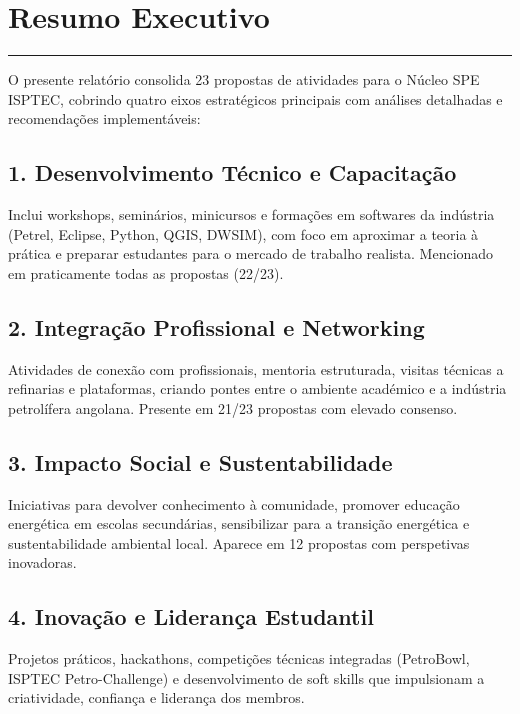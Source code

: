 \documentclass[12pt,a4paper]{article}
\begin{document}
\clearpage
\tableofcontents

\clearpage

\section*{Resumo Executivo}
\textcolor{spe-secondary}{\rule{\linewidth}{0.5pt}}

O presente relatório consolida 23 propostas de atividades para o Núcleo SPE ISPTEC, cobrindo quatro eixos estratégicos principais com análises detalhadas e recomendações implementáveis:

\subsection*{\textcolor{spe-blue}{1. Desenvolvimento Técnico e Capacitação}}
Inclui workshops, seminários, minicursos e formações em softwares da indústria (Petrel, Eclipse, Python, QGIS, DWSIM), com foco em aproximar a teoria à prática e preparar estudantes para o mercado de trabalho realista. Mencionado em praticamente todas as propostas (22/23).

\subsection*{\textcolor{spe-secondary}{2. Integração Profissional e Networking}}
Atividades de conexão com profissionais, mentoria estruturada, visitas técnicas a refinarias e plataformas, criando pontes entre o ambiente académico e a indústria petrolífera angolana. Presente em 21/23 propostas com elevado consenso.

\subsection*{\textcolor{accent}{3. Impacto Social e Sustentabilidade}}
Iniciativas para devolver conhecimento à comunidade, promover educação energética em escolas secundárias, sensibilizar para a transição energética e sustentabilidade ambiental local. Aparece em 12 propostas com perspetivas inovadoras.

\subsection*{\textcolor{spe-dark}{4. Inovação e Liderança Estudantil}}
Projetos práticos, hackathons, competições técnicas integradas (PetroBowl, ISPTEC Petro-Challenge) e desenvolvimento de soft skills que impulsionam a criatividade, confiança e liderança dos membros.
\end{document}
